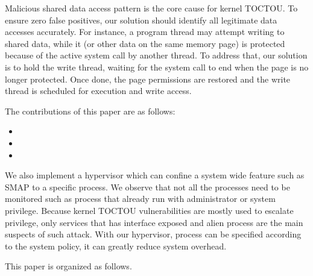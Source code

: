 Malicious shared data access pattern is the core cause for kernel TOCTOU. To ensure zero false positives, our solution should identify all legitimate data accesses accurately. For instance, a program thread may attempt writing to shared data, while it (or other data on the same memory page) is protected because of the active system call by another thread. To address that, our solution is to hold the write thread, waiting for the system call to end when the page is no longer protected. Once done, the page permissions are restored and the write thread is scheduled for execution and write access. 

The contributions of this paper are as follows:
\begin{itemize}
	\item 
    \item 
    \item 
\end{itemize}

We also implement a hypervisor which can confine a system wide feature such as SMAP to a specific process. We observe that not all the processes need to be monitored such as process that already run with administrator or system privilege. Because kernel TOCTOU vulnerabilities are mostly used to escalate privilege, only services that has interface exposed and alien process are the main suspects of such attack. With our hypervisor, process can be specified according to the system policy, it can greatly reduce system overhead.


This paper is organized as follows. 
